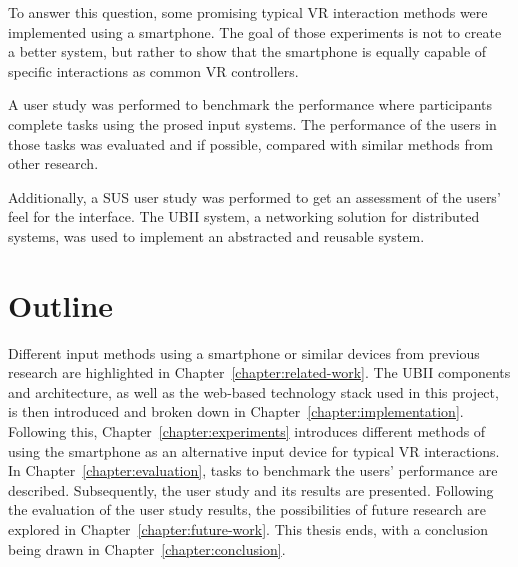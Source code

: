 To answer this question, some promising typical \gls{VR} interaction methods were implemented using a smartphone. The goal of those experiments is not to create a better system, but rather to show that the smartphone is equally capable of specific interactions as common \gls{VR} controllers.

A user study was performed to benchmark the performance where participants complete tasks using the prosed input systems.
The performance of the users in those tasks was evaluated and if possible, compared with similar methods from other research.

Additionally, a \gls{SUS} user study was performed to get an assessment of the users' feel for the interface.
The \gls{UBII} system, a networking solution for distributed systems, was used to implement an abstracted and reusable system.


\section{Outline}\label{section:outline}
Different input methods using a smartphone or similar devices from previous research are highlighted in Chapter~\ref{chapter:related-work}. The \gls{UBII} components and architecture, as well as the web-based technology stack used in this project, is then introduced and broken down in Chapter~\ref{chapter:implementation}. Following this, Chapter~\ref{chapter:experiments} introduces different methods of using the smartphone as an alternative input device for typical \gls{VR} interactions. In Chapter~\ref{chapter:evaluation}, tasks to benchmark the users' performance are described. Subsequently, the user study and its results are presented. Following the evaluation of the user study results, the possibilities of future research are explored in Chapter~\ref{chapter:future-work}. This thesis ends, with a conclusion being drawn in Chapter~\ref{chapter:conclusion}.